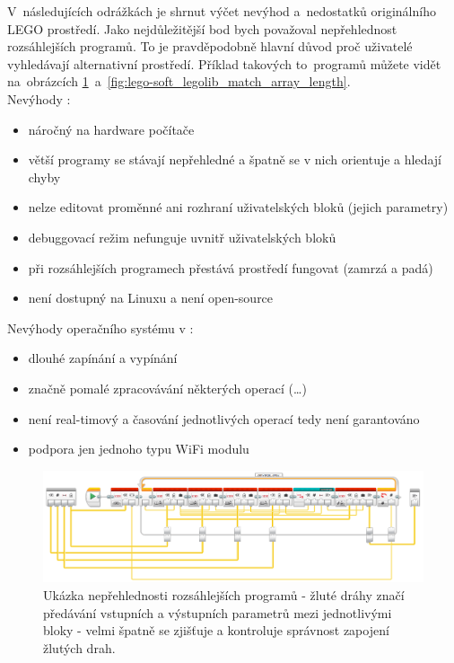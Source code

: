 V~následujících odrážkách je shrnut výčet nevýhod a~nedostatků originálního LEGO prostředí. 
Jako nejdůležitější bod bych považoval nepřehlednost rozsáhlejších programů. %
To je pravděpodobně hlavní důvod proč uživatelé \legoM{} vyhledávají alternativní prostředí. 
Příklad takových to~programů můžete vidět na~obrázcích \ref{fig:lego-soft_legolib_converge_array}~a~\ref{fig:lego-soft_legolib_match_array_length}.\\

Nevýhody \legoSW:

\renewcommand{\labelitemi}{$-$} %
\begin{itemize}[noitemsep]\itemsep2pt
	\item náročný na hardware počítače
	\item větší programy se stávají nepřehledné a špatně se v nich orientuje a hledají chyby
	\item nelze editovat proměnné ani rozhraní uživatelských bloků (jejich parametry)
	\item debuggovací režim nefunguje uvnitř uživatelských bloků
	\item při rozsáhlejších programech přestává prostředí fungovat (zamrzá a padá)
	\item není dostupný na Linuxu a není open-source
\end{itemize}

Nevýhody operačního systému v :  %
\begin{itemize}[noitemsep]\itemsep2pt
	\item dlouhé zapínání a vypínání
	\item značně pomalé zpracovávání některých operací (\dots) %
	\item není real-timový a časování jednotlivých operací tedy není garantováno
	\item podpora jen jednoho typu WiFi modulu
\end{itemize}
\renewcommand{\labelitemi}{$\bullet$} %

\begin{figure}[h]
	\centering
	\includegraphics[width=\textwidth]{images/lego-soft/lego-soft_legolib_converge_array.png}
	\caption[Ukázka nepřehlednosti rozsáhlejších programů]{Ukázka nepřehlednosti rozsáhlejších programů - žluté dráhy značí předávání vstupních a výstupních parametrů mezi jednotlivými bloky - velmi špatně se zjišťuje a kontroluje správnost zapojení žlutých drah.}
	\label{fig:lego-soft_legolib_converge_array}
\end{figure}
 

